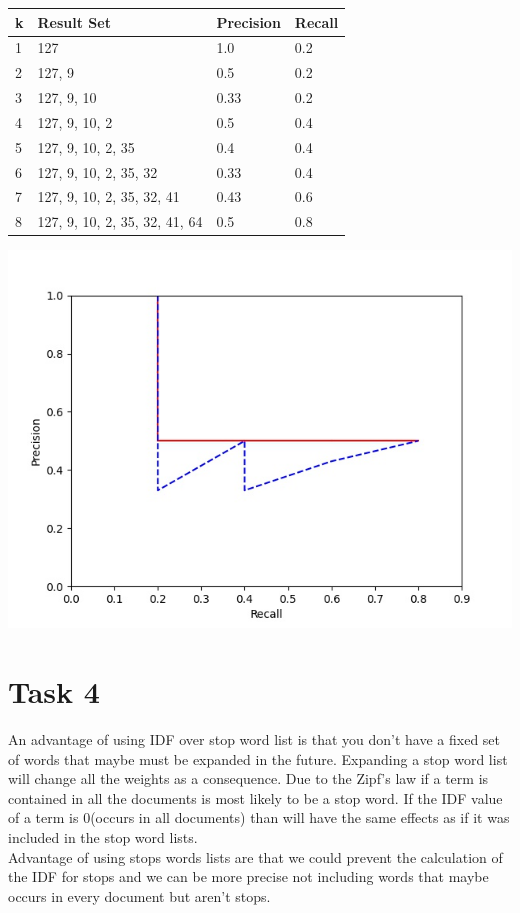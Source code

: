 \documentclass[a4paper]{scrartcl}
\begin{document}
\begin{center}
    \begin{tabular}{@{}llll@{}}
    \hline
    \textbf{k} & \textbf{Result Set}           & \textbf{Precision} & \textbf{Recall} \\ \hline
    1          & 127                           & 1.0                & 0.2             \\
    2          & 127, 9                        & 0.5                & 0.2             \\
    3          & 127, 9, 10                    & 0.33               & 0.2             \\
    4          & 127, 9, 10, 2                 & 0.5                & 0.4             \\
    5          & 127, 9, 10, 2, 35             & 0.4                & 0.4             \\
    6          & 127, 9, 10, 2, 35, 32         & 0.33               & 0.4             \\
    7          & 127, 9, 10, 2, 35, 32, 41     & 0.43               & 0.6             \\
    8          & 127, 9, 10, 2, 35, 32, 41, 64 & 0.5                & 0.8             \\ \hline
    \end{tabular}
    
    \includegraphics[width=.7\textwidth]{img/fig.jpg}
\end{center}

\section*{Task 4}

An advantage of using IDF over stop word list is that
you don't have a fixed set of words that maybe must be expanded in the future.
Expanding a stop word list will change all the weights as a consequence.
Due to the Zipf's law if a term is contained in all the documents is most likely to be a stop word.
If the IDF value of a term is 0(occurs in all documents) than will have the same effects as if it was included in the stop word lists.
\\
Advantage of using stops words lists are that we could prevent the calculation of the IDF for stops
and we can be more precise not including words that maybe occurs in every document but aren't stops.
\end{document}

